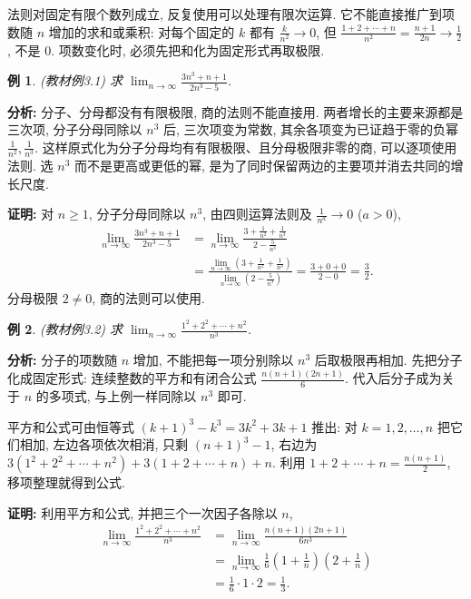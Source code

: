 \documentclass[UTF8,openany]{ctexbook}
\theoremstyle{chinesetextbook}
\newtheorem{example}{例}[section]
\newenvironment{cnproof}{\par\indent\textbf{证明:} \ignorespaces}{\par}
\begin{document}
法则对固定有限个数列成立, 反复使用可以处理有限次运算. 它不能直接推广到项数随 $n$ 增加的求和或乘积: 对每个固定的 $k$ 都有 $\displaystyle\frac k{n^2}\to0$, 但 $\displaystyle\frac{1+2+\cdots+n}{n^2}=\frac{n+1}{2n}\to\frac12$, 不是 $0$. 项数变化时, 必须先把和化为固定形式再取极限.
\begin{example}
\textnormal{(教材例3.1)} 求 $\displaystyle \lim_{n\to\infty}\frac{3n^3+n+1}{2n^3-5}$.
\end{example}
\par\indent\textbf{分析:} 分子、分母都没有有限极限, 商的法则不能直接用. 两者增长的主要来源都是三次项, 分子分母同除以 $n^3$ 后, 三次项变为常数, 其余各项变为已证趋于零的负幂 $\displaystyle\frac1{n^2},\frac1{n^3}$. 这样原式化为分子分母均有有限极限、且分母极限非零的商, 可以逐项使用法则. 选 $n^3$ 而不是更高或更低的幂, 是为了同时保留两边的主要项并消去共同的增长尺度.
\begin{cnproof}
对 $n\ge1$, 分子分母同除以 $n^3$, 由四则运算法则及 $\displaystyle\frac1{n^a}\to0$ ($a>0$),
\[
\begin{aligned}
\lim_{n\to\infty}\frac{3n^3+n+1}{2n^3-5}
&=\lim_{n\to\infty}\frac{3+\frac1{n^2}+\frac1{n^3}}{2-\frac5{n^3}}\\
&=\frac{\displaystyle\lim_{n\to\infty}\left(3+\frac1{n^2}+\frac1{n^3}\right)}{\displaystyle\lim_{n\to\infty}\left(2-\frac5{n^3}\right)}
=\frac{3+0+0}{2-0}=\frac32.
\end{aligned}
\]
分母极限 $2\ne0$, 商的法则可以使用.
\end{cnproof}
\begin{example}
\textnormal{(教材例3.2)} 求 $\displaystyle \lim_{n\to\infty}\frac{1^2+2^2+\cdots+n^2}{n^3}$.
\end{example}
\par\indent\textbf{分析:} 分子的项数随 $n$ 增加, 不能把每一项分别除以 $n^3$ 后取极限再相加. 先把分子化成固定形式: 连续整数的平方和有闭合公式 $\displaystyle\frac{n(n+1)(2n+1)}6$. 代入后分子成为关于 $n$ 的多项式, 与上例一样同除以 $n^3$ 即可.

平方和公式可由恒等式 $(k+1)^3-k^3=3k^2+3k+1$ 推出: 对 $k=1,2,\ldots,n$ 把它们相加, 左边各项依次相消, 只剩 $(n+1)^3-1$, 右边为 $3(1^2+2^2+\cdots+n^2)+3(1+2+\cdots+n)+n$. 利用 $\displaystyle1+2+\cdots+n=\frac{n(n+1)}2$, 移项整理就得到公式.
\begin{cnproof}
利用平方和公式, 并把三个一次因子各除以 $n$,
\[
\begin{aligned}
\lim_{n\to\infty}\frac{1^2+2^2+\cdots+n^2}{n^3}
&=\lim_{n\to\infty}\frac{n(n+1)(2n+1)}{6n^3}\\
&=\lim_{n\to\infty}\frac16\left(1+\frac1n\right)\left(2+\frac1n\right)\\
&=\frac16\cdot1\cdot2=\frac13.
\end{aligned}
\]
\end{cnproof}
\end{document}
